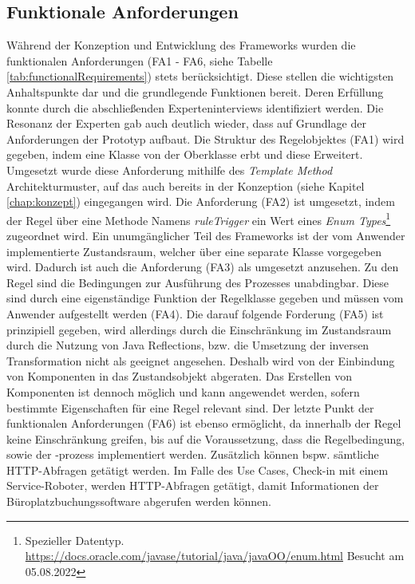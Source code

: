     \subsection*{Funktionale Anforderungen}
        Während der Konzeption und Entwicklung des Frameworks wurden die funktionalen Anforderungen (FA1 - FA6, siehe Tabelle \ref{tab:functionalRequirements}) stets 
        berücksichtigt. Diese stellen die wichtigsten Anhaltspunkte dar und die grundlegende Funktionen bereit. Deren Erfüllung konnte durch die abschließenden 
        Experteninterviews identifiziert werden. Die Resonanz der Experten gab auch deutlich wieder, dass auf Grundlage der Anforderungen der Prototyp aufbaut. Die Struktur 
        des Regelobjektes (FA1) wird gegeben, indem eine Klasse von der Oberklasse erbt und diese Erweitert. Umgesetzt wurde diese Anforderung mithilfe des 
        \textit{Template Method} Architekturmuster, auf das auch bereits in der Konzeption (siehe Kapitel \ref{chap:konzept}) eingegangen wird. Die Anforderung (FA2) ist 
        umgesetzt, indem der Regel über eine Methode Namens \textit{ruleTrigger} ein Wert eines \textit{Enum Types}\footnote{Spezieller Datentyp. \url{https://docs.oracle.com/javase/tutorial/java/javaOO/enum.html} Besucht am 05.08.2022} 
        zugeordnet wird. Ein unumgänglicher Teil des Frameworks ist der vom Anwender implementierte Zustandsraum, welcher über eine separate Klasse vorgegeben wird. Dadurch 
        ist auch die Anforderung (FA3) als umgesetzt anzusehen. Zu den Regel sind die Bedingungen zur Ausführung des Prozesses unabdingbar. Diese sind durch eine eigenständige Funktion der 
        Regelklasse gegeben und müssen vom Anwender aufgestellt werden (FA4). Die darauf folgende Forderung (FA5) ist prinzipiell gegeben, wird allerdings durch die Einschränkung im 
        Zustandsraum durch die Nutzung von Java Reflections, bzw. die Umsetzung der inversen Transformation nicht als geeignet angesehen. Deshalb wird von der Einbindung von 
        Komponenten in das Zustandsobjekt abgeraten. Das Erstellen von Komponenten ist dennoch möglich und kann angewendet werden, sofern bestimmte Eigenschaften für eine Regel relevant sind. Der 
        letzte Punkt der funktionalen Anforderungen (FA6) ist ebenso ermöglicht, da innerhalb der Regel keine Einschränkung greifen, bis auf die Voraussetzung, dass die Regelbedingung, sowie der -prozess 
        implementiert werden. Zusätzlich können bspw. sämtliche \acs{HTTP}-Abfragen getätigt werden. Im Falle des Use Cases, Check-in mit einem Service-Roboter, werden \acs{HTTP}-Abfragen getätigt, damit 
        Informationen der Büroplatzbuchungssoftware abgerufen werden können. 

